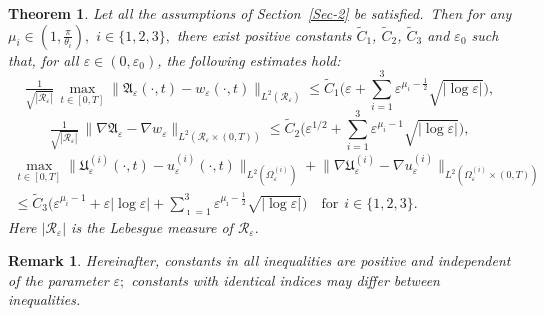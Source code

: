 \documentclass[reqno]{amsart}            %
\newtheorem{theorem}{Theorem}[section]
\newtheorem{remark}{Remark}[section]
\numberwithin{equation}{section}
\begin{document}
	\begin{theorem}\label{apriory_estimate} Let all the assumptions of Section~\ref{Sec-2} be satisfied.\
		Then for any $\mu_i \in (1, \tfrac{\pi}{\theta_i}),$  $i\in \{1,2,3\},$ there exist positive constants 
		$\tilde{C}_1$, $\tilde{C}_2$, $\tilde{C}_3$ and $\varepsilon_0$ such that, for all 
		$\varepsilon \in (0,\varepsilon_0)$, the following estimates hold:  
		\begin{equation}\label{main-1}
			\tfrac{1}{\sqrt{|\mathcal{R}_\varepsilon|}}\,\max_{t\in[0,T]} \big\|\mathfrak{A}_\varepsilon(\cdot,t) - w_\varepsilon(\cdot,t)\big\|_{L^2(\mathcal{R}_\varepsilon)} \le \tilde{C}_1 \Big(\varepsilon +  \sum_{i=1}^{3} \varepsilon^{\mu_i - \frac12} \sqrt{|\log\varepsilon|}\Big),
		\end{equation}
		\begin{equation}\label{main-2}
			\tfrac{1}{\sqrt{|\mathcal{R}_\varepsilon|}}\, \big\| \nabla\mathfrak{A}_\varepsilon - \nabla w_\varepsilon\big\|_{L^2(\mathcal{R}_\varepsilon\times (0, T))} \le \tilde{C}_2
			\Big(\varepsilon^{1/2} + \sum_{i=1}^{3} \varepsilon^{\mu_i - 1} \sqrt{|\log\varepsilon|} 
			\Big),
		\end{equation}	
		\begin{multline}\label{main-3}
			\max_{t\in[0,T]}\big\|\mathfrak{U}^{(i)}_\varepsilon(\cdot,t) - u^{(i)}_\varepsilon(\cdot,t)\big\|_{L^2(\Omega_\varepsilon^{(i)})} +	\big\|\nabla \mathfrak{U}^{(i)}_\varepsilon - \nabla u^{(i)}_\varepsilon\big\|_{L^2(\Omega_\varepsilon^{(i)}\times(0,T))}
			\\
			\le \tilde{C}_3 \Big(\varepsilon^{\mu_i -1} + \varepsilon |\log\varepsilon| + \sum_{\imath =1}^{3} \varepsilon^{\mu_\imath - \frac12} \sqrt{|\log\varepsilon|}
			\Big) \quad \text{for} \ \ i\in \{1,2,3\}.
		\end{multline}
		Here  $|\mathcal{R}_\varepsilon|$ is  the Lebesgue measure of $\mathcal{R}_\varepsilon.$
	\end{theorem}
	\begin{remark}
		Hereinafter, constants in all inequalities are positive and independent of the parameter $\varepsilon;$ constants with identical indices may differ between inequalities.
	\end{remark}
\end{document}
